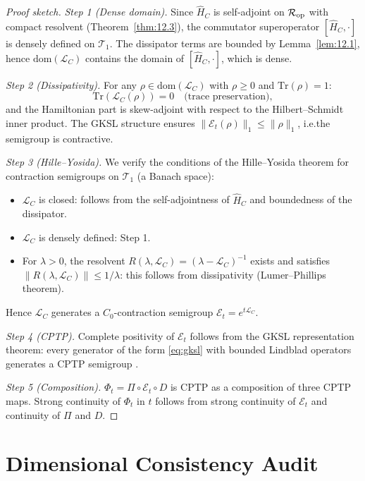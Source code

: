\begin{proof}[Proof sketch]
\emph{Step 1 (Dense domain).}
Since $\hat{H}_C$ is self-adjoint on $\mathcal{R}_{\mathrm{op}}$ with compact resolvent
(Theorem~\ref{thm:12.3}), the commutator superoperator
$[\hat{H}_C, \cdot]$ is densely defined on $\mathcal{T}_1$.
The dissipator terms are bounded by Lemma~\ref{lem:12.1}, hence
$\mathrm{dom}(\mathcal{L}_C)$ contains the domain of $[\hat{H}_C, \cdot]$,
which is dense.

\emph{Step 2 (Dissipativity).}
For any $\rho \in \mathrm{dom}(\mathcal{L}_C)$ with $\rho \geq 0$ and
$\mathrm{Tr}(\rho) = 1$:
\[
  \mathrm{Tr}(\mathcal{L}_C(\rho)) = 0
  \quad\text{(trace preservation)},
\]
and the Hamiltonian part is skew-adjoint with respect to the Hilbert--Schmidt
inner product.  The GKSL structure ensures
$\|\mathcal{E}_t(\rho)\|_1 \leq \|\rho\|_1$, i.e.\@ the semigroup is
contractive.

\emph{Step 3 (Hille--Yosida).}
We verify the conditions of the Hille--Yosida theorem for contraction
semigroups on $\mathcal{T}_1$ (a Banach space):
\begin{itemize}
  \item $\mathcal{L}_C$ is closed: follows from the self-adjointness of
    $\hat{H}_C$ and boundedness of the dissipator.
  \item $\mathcal{L}_C$ is densely defined: Step 1.
  \item For $\lambda > 0$, the resolvent
    $R(\lambda, \mathcal{L}_C) = (\lambda - \mathcal{L}_C)^{-1}$ exists
    and satisfies $\|R(\lambda, \mathcal{L}_C)\| \leq 1/\lambda$:
    this follows from dissipativity (Lumer--Phillips theorem).
\end{itemize}
Hence $\mathcal{L}_C$ generates a $C_0$-contraction semigroup
$\mathcal{E}_t = e^{t\mathcal{L}_C}$.

\emph{Step 4 (CPTP).}
Complete positivity of $\mathcal{E}_t$ follows from the GKSL
representation theorem: every generator of the form \eqref{eq:gksl}
with bounded Lindblad operators generates a CPTP semigroup
\cite{Lindblad1976,GoriniKossakowskiSudarshan1976}.

\emph{Step 5 (Composition).}
$\Phi_t = \Pi \circ \mathcal{E}_t \circ D$ is CPTP as a composition
of three CPTP maps.  Strong continuity of $\Phi_t$ in $t$ follows from
strong continuity of $\mathcal{E}_t$ and continuity of $\Pi$ and $D$.
\end{proof}

\section{Dimensional Consistency Audit}
\label{sec:dimensional}

